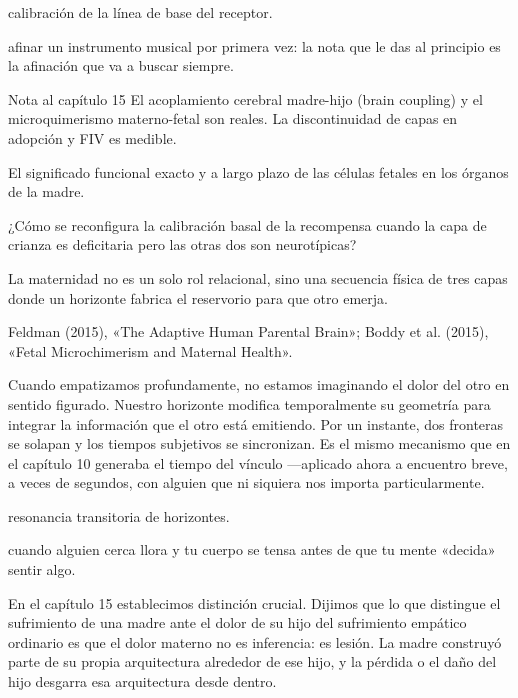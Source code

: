 \begin{fisica}
 calibración de la línea de base del receptor.

 afinar un instrumento musical por primera vez: la nota que le das al principio es la afinación que va a buscar siempre.
\end{fisica}
\begin{notacap}{Nota al capítulo 15}
 El acoplamiento cerebral madre-hijo (brain coupling) y el microquimerismo materno-fetal son reales. La discontinuidad de capas en adopción y FIV es medible.

 El significado funcional exacto y a largo plazo de las células fetales en los órganos de la madre.

 ¿Cómo se reconfigura la calibración basal de la recompensa cuando la capa de crianza es deficitaria pero las otras dos son neurotípicas?

 La maternidad no es un solo rol relacional, sino una secuencia física de tres capas donde un horizonte fabrica el reservorio para que otro emerja.

 Feldman (2015), «The Adaptive Human Parental Brain»; Boddy et al. (2015), «Fetal Microchimerism and Maternal Health».
\end{notacap}
\noindent {}

Cuando empatizamos profundamente, no estamos imaginando el dolor del otro en sentido figurado. Nuestro horizonte modifica temporalmente su geometría para integrar la información que el otro está emitiendo. Por un instante, dos fronteras se solapan y los tiempos subjetivos se sincronizan. Es el mismo mecanismo que en el capítulo 10 generaba el tiempo del vínculo —aplicado ahora a encuentro breve, a veces de segundos, con alguien que ni siquiera nos importa particularmente.

\begin{fisica}
 resonancia transitoria de horizontes.

 cuando alguien cerca llora y tu cuerpo se tensa antes de que tu mente «decida» sentir algo.
\end{fisica}
\noindent En el capítulo 15 establecimos distinción crucial. Dijimos que lo que distingue el sufrimiento de una madre ante el dolor de su hijo del sufrimiento empático ordinario es que el dolor materno no es inferencia: es lesión. La madre construyó parte de su propia arquitectura alrededor de ese hijo, y la pérdida o el daño del hijo desgarra esa arquitectura desde dentro.

